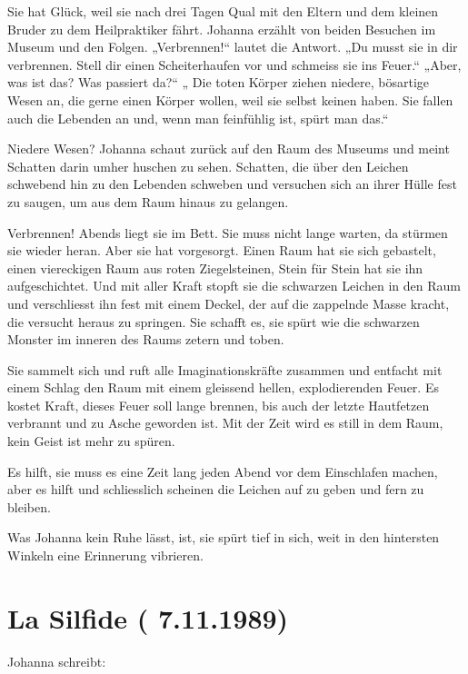 \documentclass[10pt,a5paper]{book}
\begin{document}
Sie hat Glück, weil sie nach drei Tagen Qual mit den Eltern und dem kleinen Bruder zu dem Heilpraktiker fährt. Johanna erzählt von beiden Besuchen im Museum und den Folgen. „Verbrennen!“ lautet die Antwort. „Du musst sie in dir verbrennen. Stell dir einen Scheiterhaufen vor und schmeiss sie ins Feuer.“ „Aber, was ist das? Was passiert da?“  „ Die toten Körper ziehen niedere, bösartige Wesen an, die gerne einen Körper wollen, weil sie selbst keinen haben. Sie fallen auch die Lebenden an und, wenn man feinfühlig ist, spürt man das.“

Niedere Wesen? Johanna schaut zurück auf den Raum des Museums und meint Schatten darin umher huschen zu sehen. Schatten, die über den Leichen schwebend hin zu den Lebenden schweben und versuchen sich an ihrer Hülle fest zu saugen, um aus dem Raum hinaus zu gelangen. 

Verbrennen! Abends liegt sie im Bett. Sie muss nicht lange warten, da stürmen sie wieder heran. Aber sie hat vorgesorgt. Einen Raum hat sie sich gebastelt, einen viereckigen Raum aus roten Ziegelsteinen, Stein für Stein hat sie ihn aufgeschichtet. Und mit aller Kraft stopft sie die schwarzen Leichen in den Raum und verschliesst ihn fest mit einem Deckel, der auf die zappelnde Masse kracht, die versucht heraus zu springen. Sie schafft es, sie spürt wie die schwarzen Monster im inneren des Raums zetern und toben. 

Sie sammelt sich und ruft alle Imaginationskräfte zusammen und entfacht mit einem Schlag den Raum mit einem gleissend hellen, explodierenden Feuer. Es kostet Kraft, dieses Feuer soll lange brennen, bis auch der letzte Hautfetzen verbrannt und zu Asche geworden ist. Mit der Zeit wird es still in dem Raum, kein Geist ist mehr zu spüren.

Es hilft, sie muss es eine Zeit lang jeden Abend vor dem Einschlafen machen, aber es hilft und schliesslich scheinen die Leichen auf zu geben und fern zu bleiben.

Was Johanna kein Ruhe lässt, ist, sie spürt tief in sich, weit in den hintersten Winkeln eine Erinnerung vibrieren. 



\section*{La Silfide ( 7.11.1989)}


 
Johanna schreibt:
\end{document}
